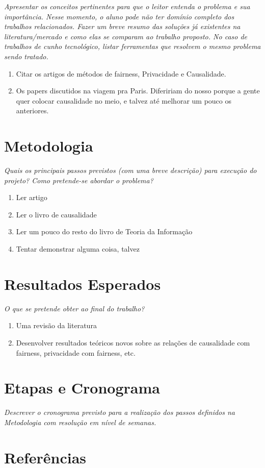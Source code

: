 \documentclass{article}
\begin{document}
\textit{Apresentar os conceitos pertinentes para que o leitor entenda o problema e sua importância. Nesse momento, o aluno pode não ter domínio completo dos trabalhos relacionados. Fazer um breve resumo das soluções já existentes na literatura/mercado e como elas se comparam ao trabalho proposto. No caso de trabalhos de cunho tecnológico, listar ferramentas que resolvem o mesmo problema sendo tratado.}

\begin{enumerate}
\item Citar os artigos de métodos de fairness, Privacidade e Causalidade. 
\item Os papers discutidos na viagem pra Paris. Difeririam do nosso porque a gente quer colocar causalidade no meio, e talvez até melhorar um pouco os anteriores.
\end{enumerate}

\section{Metodologia}

\textit{Quais os principais passos previstos (com uma breve descrição) para execução do projeto? Como pretende-se abordar o problema?}
\begin{enumerate}
\item Ler artigo
\item Ler o livro de causalidade
\item Ler um pouco do resto do livro de Teoria da Informação
\item Tentar demonstrar alguma coisa, talvez
\end{enumerate}

\section{Resultados Esperados}

\textit{O que se pretende obter ao final do trabalho?}
\begin{enumerate}
\item Uma revisão da literatura
\item Desenvolver resultados teóricos novos sobre as relações de causalidade com fairness, privacidade com fairness, etc.
\end{enumerate}

\section{Etapas e Cronograma}

\textit{Descrever o cronograma previsto para a realização dos passos definidos na Metodologia com resolução em nível de semanas.}


\section{Referências}


\end{document}
